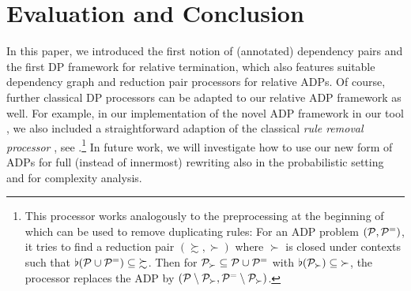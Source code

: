 \section{Evaluation and Conclusion}\label{Evaluation and Conclusion}

In this paper, we introduced the first
notion of (annotated) dependency pairs
and the first DP framework
for relative termination, which also features suitable
dependency graph and reduction pair processors for relative ADPs.
Of course, 
further classical DP processors can be adapted to our relative ADP framework as well. For
example, in our implementation of the novel ADP framework in our tool \aprove{} \cite{JAR-AProVE2017},
we also included a
straightforward adaption of the classical \emph{rule removal processor}
\cite{gieslLPAR04dpframework}, see 
.\footnote{This processor works
analogously to the preprocessing
at the beginning
of 
which can be used to remove duplicating rules: For an  ADP problem $(\mathcal{P},\mathcal{P}^{=})$, it tries to find
a reduction pair 
$(\succsim, \succ)$ 
where $\succ$ is closed under contexts
such that $\flat(\mathcal{P} \cup \mathcal{P}^{=}) \subseteq {\succsim}$.
Then for $\mathcal{P}_{\succ} \subseteq \mathcal{P} \cup \mathcal{P}^{=}$ 
with $\flat(\mathcal{P}_{\succ}) \subseteq {\succ}$, the processor replaces the ADP by 
$(\mathcal{P} \setminus \mathcal{P}_{\succ}, \mathcal{P}^{=} \setminus \mathcal{P}_{\succ})$.}
In future work, we will investigate how to use our new form of 
ADPs for full (instead of innermost) rewriting also in the probabilistic setting 
and for complexity analysis.



